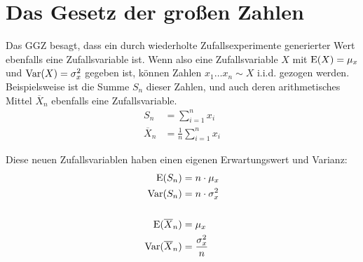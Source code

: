 


  
  
  

\section{Das Gesetz der großen Zahlen}

Das GGZ besagt, dass ein durch wiederholte Zufallsexperimente generierter Wert ebenfalls eine Zufallsvariable ist.
Wenn also eine Zufallsvariable $X$ mit $\operatorname{E}(X)=\mu_x$ und $\operatorname{Var}(X)=\sigma_x^2$ gegeben ist, 
können Zahlen $x_1 \dots x_n \sim X$ i.i.d. gezogen werden. 
Beispielsweise ist die Summe $S_n$ dieser Zahlen, und auch deren arithmetisches Mittel $\overline{X}_n$ ebenfalls eine Zufallsvariable.
\begin{align*}
 S_n &= \sum_{i=1}^n x_i \\
\overline{X}_n &= \frac{1}{n}\sum^n_{i=1}x_i
\end{align*}

Diese neuen Zufallsvariablen haben einen eigenen Erwartungswert und Varianz:
\begin{align*}
\operatorname{E}(S_n) &= n \cdot \mu_x \\
\operatorname{Var}(S_n) &= n \cdot \sigma_x^2 \\
\\
\operatorname{E}(\overline{X}_n) &= \mu_x \\
\operatorname{Var}(\overline{X}_n) &= \frac{\sigma_x^2}{n}
\end{align*}


